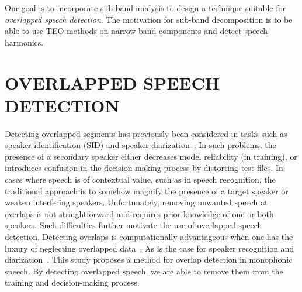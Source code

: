Our goal is to incorporate sub-band analysis to design a technique suitable for {\it overlapped speech detection}. The motivation for sub-band decomposition is to be able to use TEO methods on narrow-band components and detect speech harmonics. 



\section{OVERLAPPED SPEECH DETECTION}
\label{sec:ovldet}
Detecting overlapped segments has previously been considered in tasks such as speaker identification (SID) and speaker diarization~\cite{boakye_thesis,yantorno_report}. 
In such problems, the presence of a secondary speaker either decreases model reliability (in training), or introduces confusion in the decision-making process by distorting test files. 
In cases where speech is of contextual value, such as in speech recognition, the traditional approach is to somehow magnify the presence of a target speaker or weaken interfering speakers. 
Unfortunately, removing unwanted speech at overlaps is not straightforward and requires prior knowledge of one or both speakers. 
Such difficulties further motivate the use of overlapped speech detection. 
Detecting overlaps is computationally advantageous when one has the luxury of neglecting overlapped data~\cite{yantorno_report}. 
As is the case for speaker recognition and diarization~\cite{Boakye_is_08}. 
This study proposes a method for overlap detection in monophonic speech. 
By detecting overlapped speech, we are able to remove them from the training and decision-making process. 

